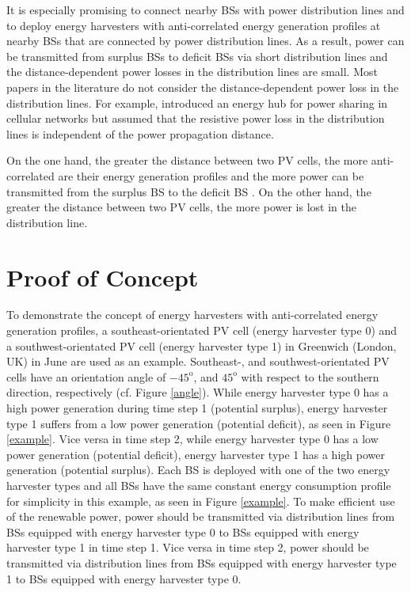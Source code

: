 It is especially promising to connect nearby BSs with power distribution lines \cite{8491374,my_con3,7143338} and to deploy energy harvesters with anti-correlated energy generation profiles at nearby BSs that are connected by power distribution lines. As a result, power can be transmitted from surplus BSs to deficit BSs via short distribution lines and the distance-dependent power losses in the distribution lines are small. Most papers in the literature do not consider the distance-dependent power loss in the distribution lines. For example, \cite{XueqingHuang2017SGEM} introduced an energy hub for power sharing in cellular networks but assumed that the resistive power loss in the distribution lines is independent of the power propagation distance.

On the one hand, the greater the distance between two PV cells, the more anti-correlated are their energy generation profiles and the more power can be transmitted from the surplus BS to the deficit BS \cite{HoffThomasE.2012MPfo,leeds}. On the other hand, the greater the distance between two PV cells, the more power is lost in the distribution line.


\section{Proof of Concept}


To demonstrate the concept of energy harvesters with anti-correlated energy generation profiles, a southeast-orientated PV cell 
(energy harvester type 0) and a southwest-orientated PV cell (energy harvester type 1) in Greenwich (London, UK) in June are used as an example. Southeast-, and southwest-orientated PV cells have an orientation angle of $-45^{\mathrm{o}}$, and $45^{\mathrm{o}}$ with respect to the southern direction, respectively (cf. Figure \ref{angle}). While energy harvester type 0 has a high power generation during time step 1 (potential surplus), energy harvester type 1 suffers from a low power generation (potential deficit), as seen in Figure \ref{example}. Vice versa in time step 2, while energy harvester type 0 has a low power generation (potential deficit), energy harvester type 1 has a high power generation (potential surplus). Each BS is deployed with one of the two energy harvester types and all BSs have the same constant energy consumption profile for simplicity in this example, as seen in Figure \ref{example}. To make efficient use of the renewable power, power should be transmitted via distribution lines from BSs equipped with energy harvester type 0 to BSs equipped with energy harvester type 1 in time step 1. Vice versa in time step 2, power should be transmitted via distribution lines from BSs equipped with energy harvester type 1 to BSs equipped with energy harvester type 0.




